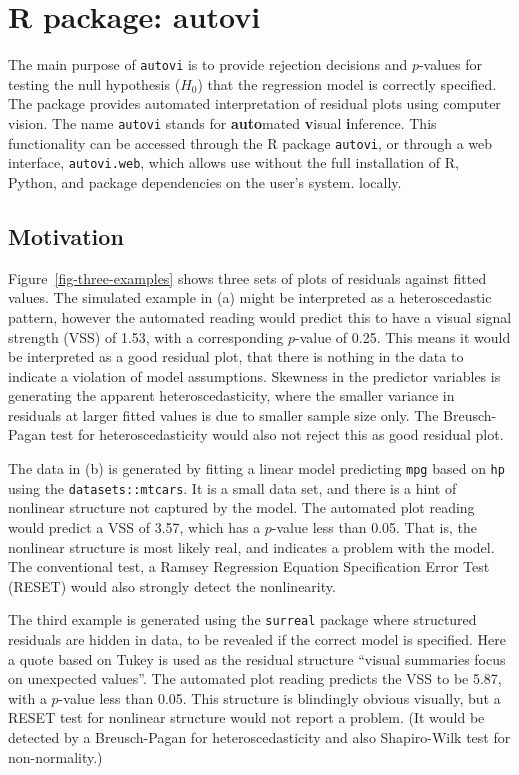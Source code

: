 \documentclass[
doublespace,
  times]{anzsauth}
\begin{document}
\section{R package: autovi}\label{sec-autovi}

The main purpose of \texttt{autovi} is to provide rejection decisions
and \(p\)-values for testing the null hypothesis (\(H_0\)) that the
regression model is correctly specified. The package provides automated
interpretation of residual plots using computer vision. The name
\texttt{autovi} stands for \textbf{auto}mated \textbf{v}isual
\textbf{i}nference. This functionality can be accessed through the R
package \texttt{autovi}, or through a web interface,
\texttt{autovi.web}, which allows use without the full installation of
R, Python, and package dependencies on the user's system. locally.

\subsection{Motivation}\label{sec-why}

Figure~\ref{fig-three-examples} shows three sets of plots of residuals
against fitted values. The simulated example in (a) might be interpreted
as a heteroscedastic pattern, however the automated reading would
predict this to have a visual signal strength (VSS) of 1.53, with a
corresponding \(p\)-value of 0.25. This means it would be interpreted as
a good residual plot, that there is nothing in the data to indicate a
violation of model assumptions. Skewness in the predictor variables is
generating the apparent heteroscedasticity, where the smaller variance
in residuals at larger fitted values is due to smaller sample size only.
The Breusch-Pagan test \citep{breusch1979simple} for heteroscedasticity
would also not reject this as good residual plot.

The data in (b) is generated by fitting a linear model predicting
\texttt{mpg} based on \texttt{hp} using the \texttt{datasets::mtcars}.
It is a small data set, and there is a hint of nonlinear structure not
captured by the model. The automated plot reading would predict a VSS of
3.57, which has a \(p\)-value less than 0.05. That is, the nonlinear
structure is most likely real, and indicates a problem with the model.
The conventional test, a Ramsey Regression Equation Specification Error
Test (RESET) \citep{ramsey1969tests} would also strongly detect the
nonlinearity.

The third example is generated using the \texttt{surreal} package
\citep{surreal} where structured residuals are hidden in data, to be
revealed if the correct model is specified. Here a quote based on Tukey
is used as the residual structure ``visual summaries focus on unexpected
values''. The automated plot reading predicts the VSS to be 5.87, with a
\(p\)-value less than 0.05. This structure is blindingly obvious
visually, but a RESET test for nonlinear structure would not report a
problem. (It would be detected by a Breusch-Pagan for heteroscedasticity
and also Shapiro-Wilk test \citep{shapiro1965analysis} for
non-normality.)
\end{document}
